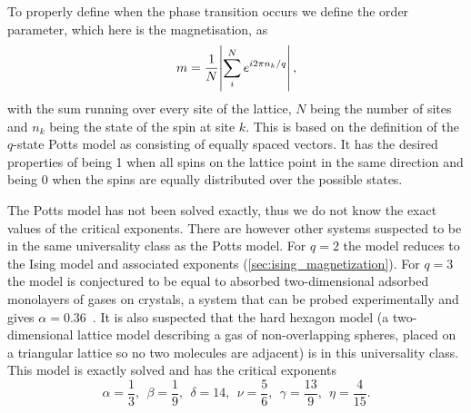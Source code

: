 \documentclass[11pt, a4paper]{report} %
\begin{document}
To properly define when the phase transition occurs we define the order parameter, which here is the magnetisation, as
\begin{equation}
	m = \frac{1}{N}\abs{\sum_i^N e^{i2\pi n_k / q}},
\end{equation}
with the sum running over every site of the lattice, \(N\) being the number of sites and \(n_k\) being the state of the spin at site \(k\).
This is based on the definition of the \(q\)-state Potts model as consisting of equally spaced vectors.
It has the desired properties of being 1 when all spins on the lattice point in the same direction and being 0 when the spins are equally distributed over the possible states.

The Potts model has not been solved exactly, thus we do not know the exact values of the critical exponents.
There are however other systems suspected to be in the same universality class as the Potts model.
For \(q=2\) the model reduces to the Ising model and associated exponents (\cref{sec:ising_magnetization}).
For \(q=3\) the model is conjectured to be equal to absorbed two-dimensional adsorbed monolayers of gases on crystals, a system that can be probed experimentally and gives \(\alpha = 0.36\)~\cite{binder:1981a}.
It is also suspected that the hard hexagon model (a two-dimensional lattice model describing a gas of non-overlapping spheres, placed on a triangular lattice so no two molecules are adjacent) is in this universality class.
This model is exactly solved and has the critical exponents~\cite{baxter:1989,wu:1982}
\begin{equation}\label{eq:potts_critical_exponents}
	\alpha = \frac{1}{3},\ \ \beta = \frac{1}{9},\ \ \delta = 14,\ \ \nu = \frac{5}{6},\ \ \gamma = \frac{13}{9},\ \ \eta = \frac{4}{15}.
\end{equation}
\end{document}

